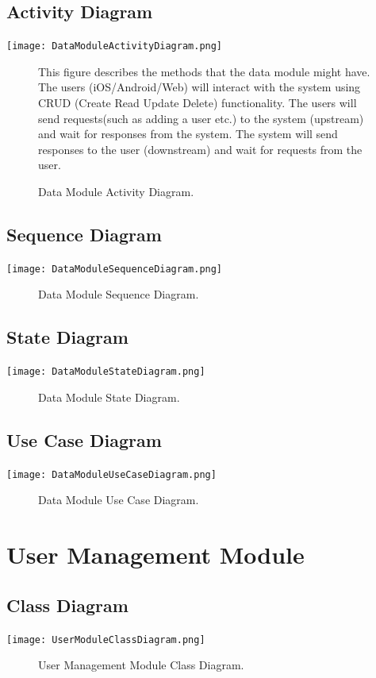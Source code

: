 \documentclass[12pt]{article}
\begin{document}
    \subsection{Activity Diagram}
        \texttt{[image: DataModuleActivityDiagram.png]}
        \begin{figure}[h]
            \caption{Data Module Activity Diagram.}
	    This figure describes the methods that the data module might have. The users (iOS/Android/Web) will interact with the system using CRUD (Create Read Update Delete) functionality. The users will send requests(such as adding a user etc.) to the system (upstream) and wait for responses from the system. The system will send responses to the user (downstream) and wait for requests from the user.
        \end{figure}

    \subsection{Sequence Diagram}
        \texttt{[image: DataModuleSequenceDiagram.png]}
        \begin{figure}[h]
            \caption{Data Module Sequence Diagram.}
        \end{figure}

	
	\subsection{State Diagram}
       \texttt{[image: DataModuleStateDiagram.png]}
        \begin{figure}[h]
        	\caption{Data Module State Diagram.}
        \end{figure}
	
	\subsection{Use Case Diagram}
        	\texttt{[image: DataModuleUseCaseDiagram.png]}
        	\begin{figure}[h]
        		\caption{Data Module Use Case Diagram.}
        	\end{figure}
	
	\section{User Management Module}
	
	\subsection{Class Diagram}
        \texttt{[image: UserModuleClassDiagram.png]}
        \begin{figure}[h]
            \caption{User Management Module Class Diagram.}
        \end{figure}
    
\end{document}

